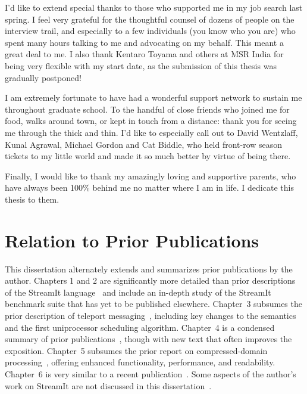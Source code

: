 I'd like to extend special thanks to those who supported me in my job
search last spring.  I feel very grateful for the thoughtful counsel
of dozens of people on the interview trail, and especially to a few
individuals (you know who you are) who spent many hours talking to me
and advocating on my behalf.  This meant a great deal to me.  I also
thank Kentaro Toyama and others at MSR India for being very flexible
with my start date, as the submission of this thesis was gradually
postponed!

I am extremely fortunate to have had a wonderful support network to
sustain me throughout graduate school.  To the handful of close
friends who joined me for food, walks around town, or kept in touch
from a distance: thank you for seeing me through the thick and thin.
I'd like to especially call out to David Wentzlaff, Kunal Agrawal,
Michael Gordon and Cat Biddle, who held front-row season tickets to my
little world and made it so much better by virtue of being there.

Finally, I would like to thank my amazingly loving and supportive
parents, who have always been 100\% behind me no matter where I am
in life.  I dedicate this thesis to them.

\section*{Relation to Prior Publications}
This dissertation alternately extends and summarizes prior
publications by the author.  Chapters 1 and 2 are significantly more
detailed than prior descriptions of the StreamIt
language~\cite{thies-cc02,thies-can02,amarasinghe-ijpp05} and include
an in-depth study of the StreamIt benchmark suite that has yet to be
published elsewhere.  Chapter~3 subsumes the prior description of
teleport messaging~\cite{thies-ppopp05}, including key changes to the
semantics and the first uniprocessor scheduling algorithm.  Chapter~4
is a condensed summary of prior
publications~\cite{gordon-asplos02,lamb-pldi03,agrawal-cases05,sermulins-lctes05,gordon-asplos06},
though with new text that often improves the exposition.  Chapter~5
subsumes the prior report on compressed-domain
processing~\cite{thies07compression}, offering enhanced functionality,
performance, and readability.  Chapter~6 is very similar to a recent
publication~\cite{thies-micro07}.  Some aspects of the author's work
on StreamIt are not discussed in this
dissertation~\cite{karczmarek-lctes03,chen-graphics05}.

